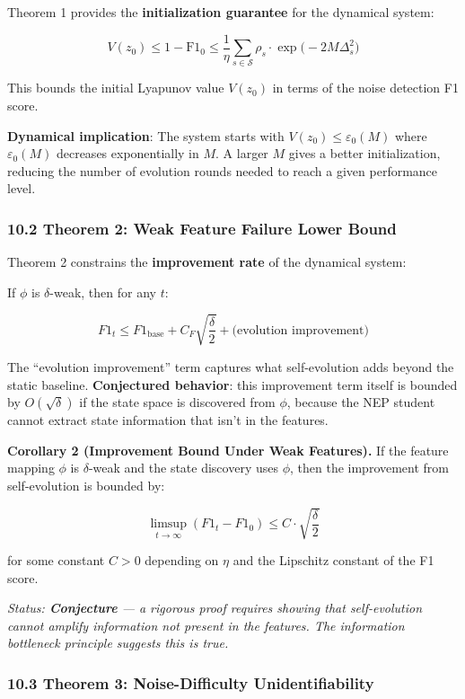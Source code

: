 \documentclass[
  12pt,
]{ctexart}
\begin{document}
Theorem 1 provides the \textbf{initialization guarantee} for the
dynamical system:

\[V(z_0) \leq 1 - \text{F1}_0 \leq \frac{1}{\eta} \sum_{s \in \mathcal{S}} \rho_s \cdot \exp\bigl(-2M\Delta_s^2\bigr)\]

This bounds the initial Lyapunov value \(V(z_0)\) in terms of the noise
detection F1 score.

\textbf{Dynamical implication}: The system starts with
\(V(z_0) \leq \varepsilon_0(M)\) where \(\varepsilon_0(M)\) decreases
exponentially in \(M\). A larger \(M\) gives a better initialization,
reducing the number of evolution rounds needed to reach a given
performance level.

\subsubsection{10.2 Theorem 2: Weak Feature Failure Lower
Bound}\label{theorem-2-weak-feature-failure-lower-bound}

Theorem 2 constrains the \textbf{improvement rate} of the dynamical
system:

If \(\phi\) is \(\delta\)-weak, then for any \(t\):

\[F1_t \leq F1_{\text{base}} + C_F \sqrt{\frac{\delta}{2}} + \text{(evolution improvement)}\]

The ``evolution improvement'' term captures what self-evolution adds
beyond the static baseline. \textbf{Conjectured behavior}: this
improvement term itself is bounded by \(O(\sqrt{\delta})\) if the state
space is discovered from \(\phi\), because the NEP student cannot
extract state information that isn't in the features.

\textbf{Corollary 2 (Improvement Bound Under Weak Features).} If the
feature mapping \(\phi\) is \(\delta\)-weak and the state discovery uses
\(\phi\), then the improvement from self-evolution is bounded by:

\[\limsup_{t \to \infty} (F1_t - F1_0) \leq C \cdot \sqrt{\frac{\delta}{2}}\]

for some constant \(C > 0\) depending on \(\eta\) and the Lipschitz
constant of the F1 score.

\emph{Status: \textbf{Conjecture} --- a rigorous proof requires showing
that self-evolution cannot amplify information not present in the
features. The information bottleneck principle suggests this is true.}

\subsubsection{10.3 Theorem 3: Noise-Difficulty
Unidentifiability}\label{theorem-3-noise-difficulty-unidentifiability}
\end{document}
